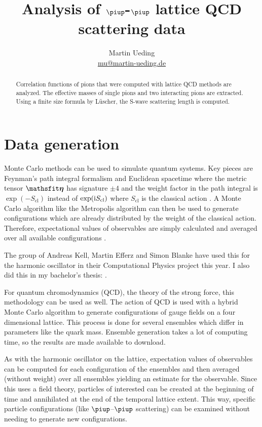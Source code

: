 \documentclass[11pt, english, fleqn, DIV=10, headinclude]{scrartcl}
\title{Analysis of $\piup$-$\piup$ lattice QCD \\ scattering data}
\author{
    Martin Ueding \\ \small{\href{mailto:mu@martin-ueding.de}{mu@martin-ueding.de}}
}
\begin{document}
\maketitle

\begin{abstract}
    Correlation functions of pions that were computed with lattice QCD methods
    are analyzed. The effective masses of single pions and two interacting
    pions are extracted. Using a finite size formula by Lüscher, the S-wave
    scattering length is computed.
\end{abstract}

\tableofcontents

\newpage

\section{Data generation}

Monte Carlo methods can be used to simulate quantum systems. Key pieces are
Feynman's path integral formalism and Euclidean spacetime where the metric
tensor $\tens\eta$ has signature $\pm 4$ and the weight factor in the path
integral is $\exp(-S_\text{cl})$ instead of $\exp(\mathrm i S_\text{cl})$ where
$S_\text{cl}$ is the classical action
\parencite[Section~2]{Creutz/Statistical_Approach_QM}. A Monte Carlo algorithm
like the Metropolis algorithm can then be used to generate configurations which
are already distributed by the weight of the classical action. Therefore,
expectational values of observables are simply calculated and averaged over all
available configurations \parencite[(3.7)]{Creutz/Statistical_Approach_QM}.

The group of Andreas Kell, Martin Efferz and Simon Blanke have used this for
the harmonic oscillator in their Computational Physics project this year. I
also did this in my bachelor's thesis: \parencite{Ueding/Bachelorarbeit}.

For quantum chromodynamics (QCD), the theory of the strong force, this
methodology can be used as well. The action of QCD is used with a hybrid Monte
Carlo algorithm to generate configurations of gauge fields on a four
dimensional lattice. This process is done for several ensembles which differ in
parameters like the quark mass. Ensemble generation takes a lot of computing
time, so the results are made available to download.

As with the harmonic oscillator on the lattice, expectation values of
observables can be computed for each configuration of the ensembles and then
averaged (without weight) over all ensembles yielding an estimate for the
observable. Since this uses a field theory, particles of interested can be
created at the beginning of time and annihilated at the end of the temporal
lattice extent. This way, specific particle configurations (like
$\piup$–$\piup$ scattering) can be examined without needing to generate new
configurations.
\end{document}
